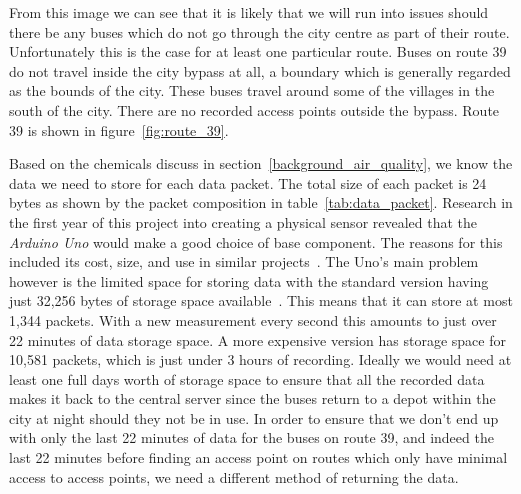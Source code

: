 
        From this image we can see that it is likely that we will run into issues should there be any buses which do not go through the city centre as part of their route. Unfortunately this is the case for at least one particular route. Buses on route 39 do not travel inside the city bypass at all, a boundary which is generally regarded as the bounds of the city. These buses travel around some of the villages in the south of the city. There are no recorded access points outside the bypass. Route 39 is shown in figure~\ref{fig:route_39}.


        Based on the chemicals discuss in section~\ref{background_air_quality}, we know the data we need to store for each data packet. The total size of each packet is 24 bytes as shown by the packet composition in table~\ref{tab:data_packet}. Research in the first year of this project into creating a physical sensor revealed that the \emph{Arduino Uno} would make a good choice of base component. The reasons for this included its cost, size, and use in similar projects~\cite{arduinoproj1,arduinoproj2,arduinoproj3}. The Uno's main problem however is the limited space for storing data with the standard version having just 32,256 bytes of storage space available~\cite{arduinounospecs}. This means that it can store at most 1,344 packets. With a new measurement every second this amounts to just over 22 minutes of data storage space. A more expensive version has storage space for 10,581 packets, which is just under 3 hours of recording. Ideally we would need at least one full days worth of storage space to ensure that all the recorded data makes it back to the central server since the buses return to a depot within the city at night should they not be in use. In order to ensure that we don't end up with only the last 22 minutes of data for the buses on route 39, and indeed the last 22 minutes before finding an access point on routes which only have minimal access to access points, we need a different method of returning the data.

